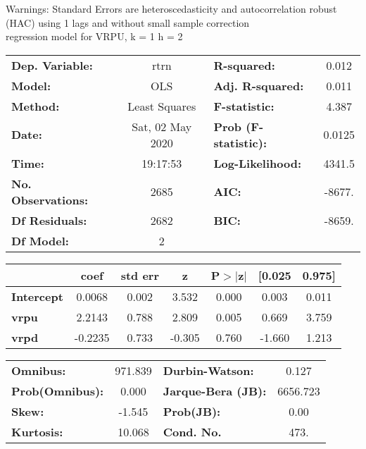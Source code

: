Warnings: \newline
 [1] Standard Errors are heteroscedasticity and autocorrelation robust (HAC) using 1 lags and without small sample correction\\ 

regression model for VRPU, k = 1 h = 2\begin{center}
\begin{tabular}{lclc}
\toprule
\textbf{Dep. Variable:}    &       rtrn       & \textbf{  R-squared:         } &     0.012   \\
\textbf{Model:}            &       OLS        & \textbf{  Adj. R-squared:    } &     0.011   \\
\textbf{Method:}           &  Least Squares   & \textbf{  F-statistic:       } &     4.387   \\
\textbf{Date:}             & Sat, 02 May 2020 & \textbf{  Prob (F-statistic):} &   0.0125    \\
\textbf{Time:}             &     19:17:53     & \textbf{  Log-Likelihood:    } &    4341.5   \\
\textbf{No. Observations:} &        2685      & \textbf{  AIC:               } &    -8677.   \\
\textbf{Df Residuals:}     &        2682      & \textbf{  BIC:               } &    -8659.   \\
\textbf{Df Model:}         &           2      & \textbf{                     } &             \\
\bottomrule
\end{tabular}
\begin{tabular}{lcccccc}
                   & \textbf{coef} & \textbf{std err} & \textbf{z} & \textbf{P$> |$z$|$} & \textbf{[0.025} & \textbf{0.975]}  \\
\midrule
\textbf{Intercept} &       0.0068  &        0.002     &     3.532  &         0.000        &        0.003    &        0.011     \\
\textbf{vrpu}      &       2.2143  &        0.788     &     2.809  &         0.005        &        0.669    &        3.759     \\
\textbf{vrpd}      &      -0.2235  &        0.733     &    -0.305  &         0.760        &       -1.660    &        1.213     \\
\bottomrule
\end{tabular}
\begin{tabular}{lclc}
\textbf{Omnibus:}       & 971.839 & \textbf{  Durbin-Watson:     } &    0.127  \\
\textbf{Prob(Omnibus):} &   0.000 & \textbf{  Jarque-Bera (JB):  } & 6656.723  \\
\textbf{Skew:}          &  -1.545 & \textbf{  Prob(JB):          } &     0.00  \\
\textbf{Kurtosis:}      &  10.068 & \textbf{  Cond. No.          } &     473.  \\
\bottomrule
\end{tabular}
\end{center}

